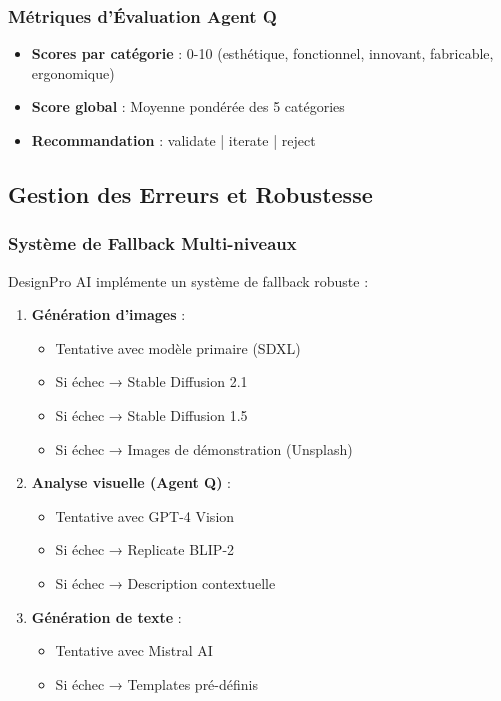 \subsubsection{Métriques d'Évaluation Agent Q}

\begin{itemize}[leftmargin=*]
    \item \textbf{Scores par catégorie} : 0-10 (esthétique, fonctionnel, innovant, fabricable, ergonomique)
    \item \textbf{Score global} : Moyenne pondérée des 5 catégories
    \item \textbf{Recommandation} : validate | iterate | reject
\end{itemize}

\subsection{Gestion des Erreurs et Robustesse}

\subsubsection{Système de Fallback Multi-niveaux}

DesignPro AI implémente un système de fallback robuste :

\begin{enumerate}[leftmargin=*]
    \item \textbf{Génération d'images} :
    \begin{itemize}
        \item Tentative avec modèle primaire (SDXL)
        \item Si échec → Stable Diffusion 2.1
        \item Si échec → Stable Diffusion 1.5
        \item Si échec → Images de démonstration (Unsplash)
    \end{itemize}
    
    \item \textbf{Analyse visuelle (Agent Q)} :
    \begin{itemize}
        \item Tentative avec GPT-4 Vision
        \item Si échec → Replicate BLIP-2
        \item Si échec → Description contextuelle
    \end{itemize}
    
    \item \textbf{Génération de texte} :
    \begin{itemize}
        \item Tentative avec Mistral AI
        \item Si échec → Templates pré-définis
    \end{itemize}
\end{enumerate}

